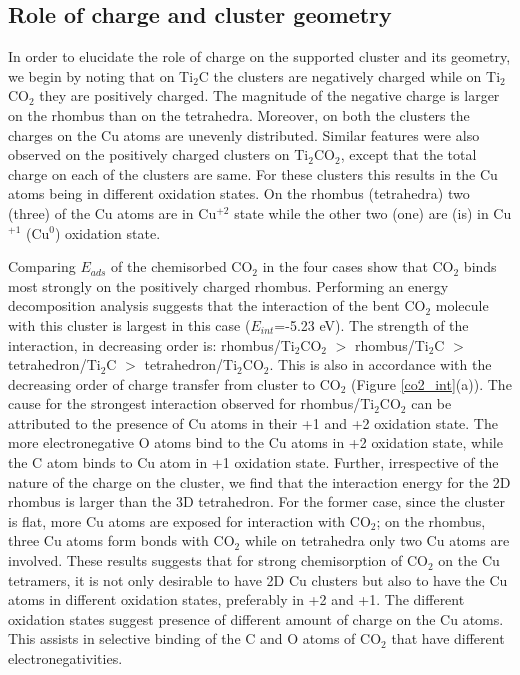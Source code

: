 \subsection{Role of charge and cluster geometry}
In order to elucidate the role of charge on the supported cluster and its geometry, we begin by noting
that on Ti$_2$C the clusters are negatively charged while on Ti$_2$CO$_2$ they are positively charged.
The magnitude of the negative charge is larger on the rhombus than on the tetrahedra. Moreover, on both
the clusters the charges on the Cu atoms are unevenly distributed. Similar features were also observed
on the positively charged clusters on Ti$_2$CO$_2$, except that the total charge on each of the clusters
are same. For these clusters this results in the Cu atoms being
in different oxidation states. On the rhombus (tetrahedra) two (three) of the Cu atoms are in Cu$^{+2}$ state while the other
two (one) are (is) in Cu$^{+1}$ (Cu$^0$) oxidation state. 

Comparing $E_{ads}$ of the chemisorbed CO$_2$ in the four cases show that CO$_2$ binds most strongly
on the positively charged rhombus. Performing an energy decomposition analysis suggests that the interaction
of the bent CO$_2$ molecule with this cluster is largest in this case ($E_{int}$=-5.23 eV). The strength
of the interaction, in decreasing order is: rhombus/Ti$_2$CO$_2$ $>$ rhombus/Ti$_2$C $>$ tetrahedron/Ti$_2$C
$>$ tetrahedron/Ti$_2$CO$_2$. This is also in accordance with the decreasing order of charge transfer from
cluster to CO$_2$ (Figure \ref{co2_int}(a)). The cause for the strongest interaction observed for rhombus/Ti$_2$CO$_2$
can be attributed to the presence of Cu atoms in their +1 and +2 oxidation state. The more electronegative O atoms 
bind to the Cu atoms in +2 oxidation state, while the C atom binds to Cu atom in +1 oxidation state.
Further, irrespective of the nature of the charge on the cluster, we find that the interaction energy
for the 2D rhombus is larger than the 3D tetrahedron. For the former case, since the cluster is flat, more
Cu atoms are exposed for interaction with CO$_2$; on the rhombus, three Cu atoms form bonds with CO$_2$ while
on tetrahedra only two Cu atoms are involved. These results suggests that for strong chemisorption of
CO$_2$ on the Cu tetramers, it is not only desirable to have 2D Cu clusters but also to have the Cu atoms
in different oxidation states, preferably in +2 and +1. The different oxidation states suggest presence
of different amount of charge on the Cu atoms. This assists in selective binding of the C and O atoms of CO$_2$
that have different electronegativities.


